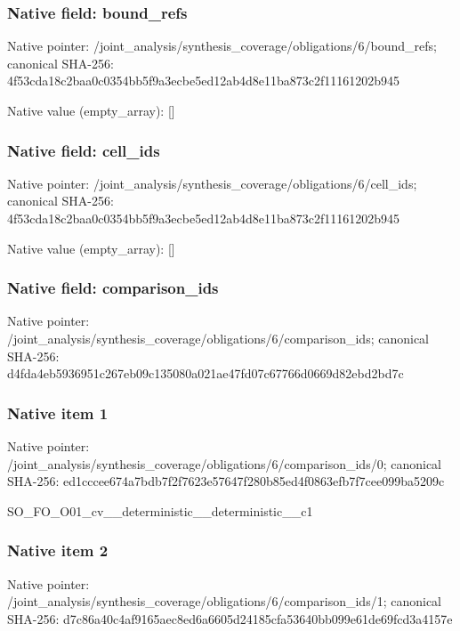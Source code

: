\documentclass[10pt,a4paper]{article}
\begin{document}
\subsubsection{Native field: bound\_\allowbreak{}refs}
Native pointer: /joint\_\allowbreak{}analysis/synthesis\_\allowbreak{}coverage/obligations/6/bound\_\allowbreak{}refs; canonical SHA-256: 4f53cda18c2baa0c0354bb5f9a3ecbe5ed12ab4d8e11ba873c2f11161202b945

Native value (empty\_\allowbreak{}array): []

\subsubsection{Native field: cell\_\allowbreak{}ids}
Native pointer: /joint\_\allowbreak{}analysis/synthesis\_\allowbreak{}coverage/obligations/6/cell\_\allowbreak{}ids; canonical SHA-256: 4f53cda18c2baa0c0354bb5f9a3ecbe5ed12ab4d8e11ba873c2f11161202b945

Native value (empty\_\allowbreak{}array): []

\subsubsection{Native field: comparison\_\allowbreak{}ids}
Native pointer: /joint\_\allowbreak{}analysis/synthesis\_\allowbreak{}coverage/obligations/6/comparison\_\allowbreak{}ids; canonical SHA-256: d4fda4eb5936951c267eb09c135080a021ae47fd07c67766d0669d82ebd2bd7c

\subsubsection{Native item 1}
Native pointer: /joint\_\allowbreak{}analysis/synthesis\_\allowbreak{}coverage/obligations/6/comparison\_\allowbreak{}ids/0; canonical SHA-256: ed1cccee674a7bdb7f2f7623e57647f280b85ed4f0863efb7f7cee099ba5209c

\begingroup\raggedright\sloppy SO\_\allowbreak{}FO\_\allowbreak{}O01\_\allowbreak{}cv\_\allowbreak{}\_\allowbreak{}deterministic\_\allowbreak{}\_\allowbreak{}deterministic\_\allowbreak{}\_\allowbreak{}c1\par\endgroup

\subsubsection{Native item 2}
Native pointer: /joint\_\allowbreak{}analysis/synthesis\_\allowbreak{}coverage/obligations/6/comparison\_\allowbreak{}ids/1; canonical SHA-256: d7c86a40c4af9165aec8ed6a6605d24185cfa53640bb099e61de69fcd3a4157e
\end{document}
